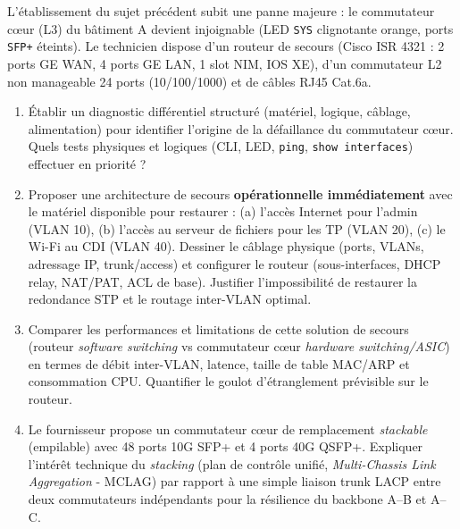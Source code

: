 \documentclass[11pt]{article}
\begin{document}
\begin{exercice}
L'établissement du sujet précédent subit une panne majeure : le commutateur cœur (L3) du bâtiment A devient injoignable (LED \texttt{SYS} clignotante orange, ports \texttt{SFP+} éteints). Le technicien dispose d'un routeur de secours (Cisco ISR 4321 : 2 ports GE WAN, 4 ports GE LAN, 1 slot NIM, IOS XE), d'un commutateur L2 non manageable 24 ports (10/100/1000) et de câbles RJ45 Cat.6a.
\begin{enumerate}
    \item Établir un diagnostic différentiel structuré (matériel, logique, câblage, alimentation) pour identifier l'origine de la défaillance du commutateur cœur. Quels tests physiques et logiques (CLI, LED, \texttt{ping}, \texttt{show interfaces}) effectuer en priorité ?
    \item Proposer une architecture de secours \textbf{opérationnelle immédiatement} avec le matériel disponible pour restaurer : (a) l'accès Internet pour l'admin (VLAN 10), (b) l'accès au serveur de fichiers pour les TP (VLAN 20), (c) le Wi-Fi au CDI (VLAN 40). Dessiner le câblage physique (ports, VLANs, adressage IP, trunk/access) et configurer le routeur (sous-interfaces, DHCP relay, NAT/PAT, ACL de base). Justifier l'impossibilité de restaurer la redondance STP et le routage inter-VLAN optimal.
    \item Comparer les performances et limitations de cette solution de secours (routeur \textit{software switching} vs commutateur cœur \textit{hardware switching/ASIC}) en termes de débit inter-VLAN, latence, taille de table MAC/ARP et consommation CPU. Quantifier le goulot d'étranglement prévisible sur le routeur.
    \item Le fournisseur propose un commutateur cœur de remplacement \textit{stackable} (empilable) avec 48 ports 10G SFP+ et 4 ports 40G QSFP+. Expliquer l'intérêt technique du \textit{stacking} (plan de contrôle unifié, \textit{Multi-Chassis Link Aggregation} - MCLAG) par rapport à une simple liaison trunk LACP entre deux commutateurs indépendants pour la résilience du backbone A--B et A--C.
\end{enumerate}
\end{exercice}
\end{document}
